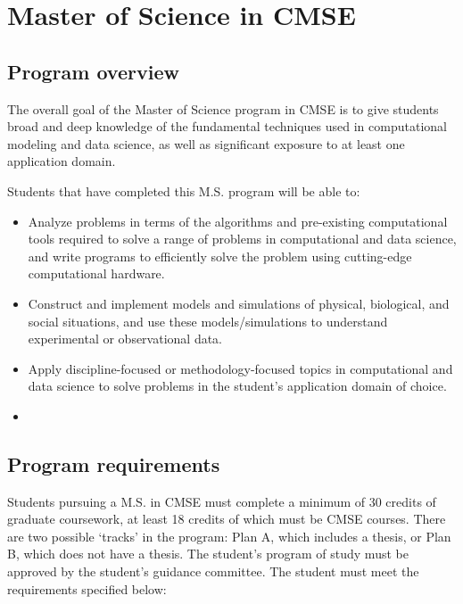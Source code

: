 \section{Master of Science in CMSE}
\label{sec:ms}

\subsection{Program overview}

The overall goal of the Master of Science program in CMSE is to give students broad and
deep knowledge of the fundamental techniques used in computational
modeling and data science, as well as significant exposure to at least
one application domain.

\vspace{2mm}
\noindent
Students that have completed this M.S. program will be able to:

\begin{itemize}
\item  Analyze problems in terms of the algorithms and pre-existing
  computational tools required to solve a range of problems in
  computational and data science, and write programs to efficiently
  solve the problem using cutting-edge computational hardware.  

\item  Construct and implement models and simulations of physical,
  biological, and social situations, and use these models/simulations
  to understand experimental or observational data.  

\item  Apply discipline-focused or methodology-focused topics in
  computational and data science to solve problems in the student’s
  application domain of choice.

\item  {}

\end{itemize}

\subsection{Program requirements}

Students pursuing a M.S. in CMSE must complete a minimum of 30 credits
of graduate coursework, at least 18 credits of which must be CMSE
courses. There are two possible `tracks' in the program: Plan A, which
includes a thesis, or Plan B, which does not have a thesis. The
student’s program of study must be approved by the student’s guidance
committee. The student must meet the requirements specified below:


